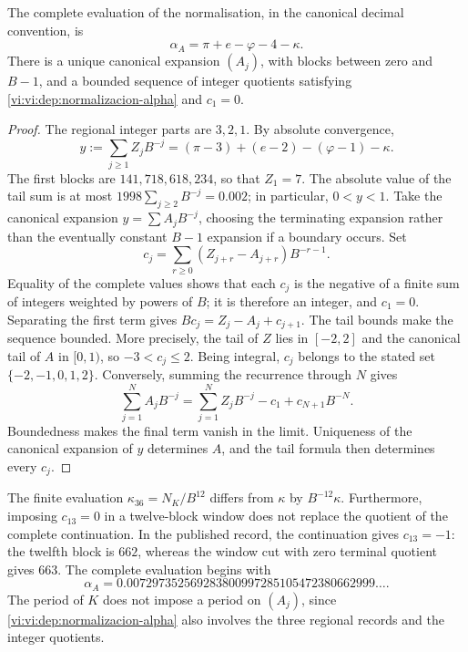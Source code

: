 \begin{theorem}
\label{vi:vi:dep:alpha-completa}
The complete evaluation of the normalisation, in the canonical decimal
convention, is
\begin{equation}
 \alpha_A=\pi+e-\varphi-4-\kappa.
 \label{vi:vi:dep:alpha-A}
\end{equation}
There is a unique canonical expansion \((A_j)\), with blocks between zero
and \(B-1\), and a bounded sequence of integer quotients satisfying
\eqref{vi:vi:dep:normalizacion-alpha} and \(c_1=0\).
\end{theorem}
\begin{proof}
The regional integer parts are \(3,2,1\). By absolute convergence,
\[
 y:=\sum_{j\ge1}Z_jB^{-j}
   =(\pi-3)+(e-2)-(\varphi-1)-\kappa.
\]
The first blocks are \(141,718,618,234\), so that
\(Z_1=7\). The absolute value of the tail sum is at most
\(1998\sum_{j\ge2}B^{-j}=0.002\); in particular, \(0<y<1\).
Take the canonical expansion \(y=\sum A_jB^{-j}\), choosing the
terminating expansion rather than the eventually constant \(B-1\) expansion if a
boundary occurs. Set
\[
 c_j=\sum_{r\ge0}(Z_{j+r}-A_{j+r})B^{-r-1}.
\]
Equality of the complete values shows that each \(c_j\) is the
negative of a finite sum of integers weighted by powers of
\(B\); it is therefore an integer, and \(c_1=0\). Separating the first term
gives \(Bc_j=Z_j-A_j+c_{j+1}\). The tail bounds make the
sequence bounded. More precisely, the tail of \(Z\) lies in \([-2,2]\)
and the canonical tail of \(A\) in \([0,1)\), so
\(-3<c_j\le2\). Being integral, \(c_j\) belongs to the stated set
\(\{-2,-1,0,1,2\}\).
Conversely, summing the recurrence through \(N\) gives
\[
 \sum_{j=1}^N A_jB^{-j}
 =\sum_{j=1}^N Z_jB^{-j}-c_1+c_{N+1}B^{-N}.
\]
Boundedness makes the final term vanish in the limit. Uniqueness of the
canonical expansion of \(y\) determines \(A\), and the tail formula
then determines every \(c_j\).
\end{proof}

The finite evaluation \(\kappa_{36}=N_K/B^{12}\) differs from
\(\kappa\) by \(B^{-12}\kappa\). Furthermore, imposing
\(c_{13}=0\) in a twelve-block window does not replace the quotient
of the complete continuation. In the published record, the continuation
gives \(c_{13}=-1\): the twelfth block is \(662\), whereas the
window cut with zero terminal quotient gives \(663\). The complete
evaluation begins with
\[
 \alpha_A=0.007297352569283800997285105472380662999\ldots.
\]
The period of \(K\) does not impose a period on \((A_j)\), since
\eqref{vi:vi:dep:normalizacion-alpha} also involves the three
regional records and the integer quotients.

